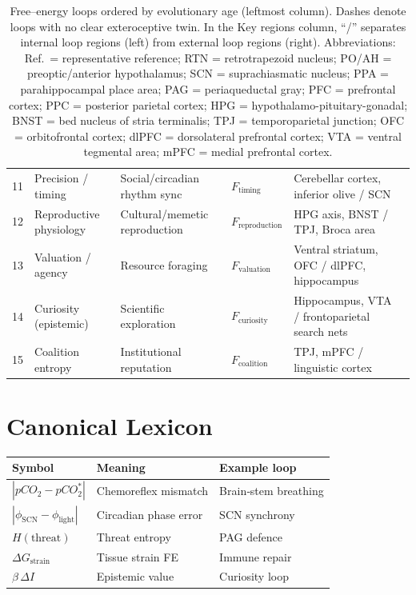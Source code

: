 \documentclass[11pt]{article}
\begin{document}
\begin{table}[ht]
\begin{tabular}{@{}r p{3.0cm} p{3.0cm} p{2.3cm} p{3.5cm} p{1.2cm}@{}}
11 & Precision / timing & Social/circadian rhythm sync & $F_{\text{timing}}$ & Cerebellar cortex, inferior olive / SCN & \cite{popa2018cerebellum}\\
12 & Reproductive physiology & Cultural/memetic reproduction & $F_{\text{reproduction}}$ & HPG axis, BNST / TPJ, Broca area & \cite{clarke2022hpg}\\
13 & Valuation / agency & Resource foraging & $F_{\text{valuation}}$ & Ventral striatum, OFC / dlPFC, hippocampus & \cite{sarter2023attention}\\
14 & Curiosity (epistemic) & Scientific exploration & $F_{\text{curiosity}}$ & Hippocampus, VTA / frontoparietal search nets & \cite{gruber2022curiosity}\\
15 & Coalition entropy & Institutional reputation & $F_{\text{coalition}}$ & TPJ, mPFC / linguistic cortex & \cite{scholz2023rtpj}\\

\bottomrule
\end{tabular}
\caption{Free--energy loops ordered by evolutionary age (leftmost column).  Dashes denote loops with no clear exteroceptive twin. In the Key regions column, ``/'' separates internal loop regions (left) from external loop regions (right).  Abbreviations: 
Ref.\ = representative reference; 
RTN = retrotrapezoid nucleus; 
PO/AH = preoptic/anterior hypothalamus;
SCN = suprachiasmatic nucleus; 
PPA = parahippocampal place area; 
PAG = periaqueductal gray; 
PFC = prefrontal cortex;
PPC = posterior parietal cortex; 
HPG = hypothalamo-pituitary-gonadal; 
BNST = bed nucleus of stria terminalis; 
TPJ = temporoparietal junction; 
OFC = orbitofrontal cortex; 
dlPFC = dorsolateral prefrontal cortex; 
VTA = ventral tegmental area; 
mPFC = medial prefrontal cortex.}
\label{tab:ledger}
\end{table}

\section{Canonical Lexicon}

\begin{tabular}{lll}
\textbf{Symbol} & \textbf{Meaning} & \textbf{Example loop} \\
\hline
$|pCO_2-pCO_2^{*}|$ & Chemoreflex mismatch & Brain‑stem breathing \\
$|\phi_{\mathrm{SCN}}-\phi_{\text{light}}|$ & Circadian phase error & SCN synchrony \\
$H(\text{threat})$ & Threat entropy & PAG defence \\
$\Delta G_{\text{strain}}$ & Tissue strain FE & Immune repair \\
$\beta\,\Delta I$ & Epistemic value & Curiosity loop \\
\hline
\end{tabular}
\end{document}
